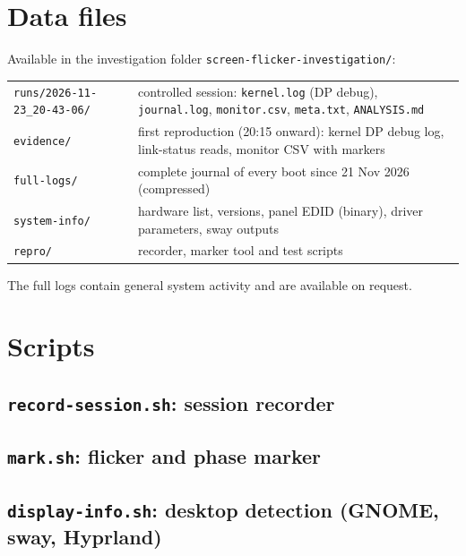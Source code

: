 \documentclass[11pt,a4paper]{article}
\newcommand{\reg}[1]{\texttt{#1}}
\begin{document}
\appendix
\section{Data files}
Available in the investigation folder \reg{screen-flicker-investigation/}:
\begin{center}
\small
\begin{tabularx}{\linewidth}{@{}l Y@{}}
\toprule
\reg{runs/2026-11-23\_20-43-06/} & controlled session: \reg{kernel.log} (DP debug), \reg{journal.log}, \reg{monitor.csv}, \reg{meta.txt}, \reg{ANALYSIS.md}\\
\reg{evidence/} & first reproduction (20:15 onward): kernel DP debug log, link-status reads, monitor CSV with markers\\
\reg{full-logs/} & complete journal of every boot since 21 Nov 2026 (compressed)\\
\reg{system-info/} & hardware list, versions, panel EDID (binary), driver parameters, sway outputs\\
\reg{repro/} & recorder, marker tool and test scripts\\
\bottomrule
\end{tabularx}
\end{center}
The full logs contain general system activity and are available on request.

\section{Scripts}
\label{app:scripts}
\subsection{\texttt{record-session.sh}: session recorder}

\subsection{\texttt{mark.sh}: flicker and phase marker}

\subsection{\texttt{display-info.sh}: desktop detection (GNOME, sway, Hyprland)}

\end{document}
